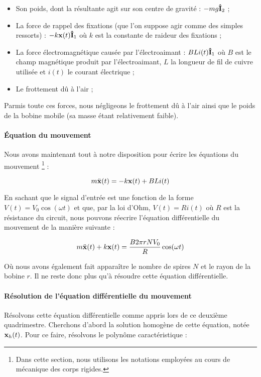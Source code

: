 \begin{itemize}
	\item Son poids, dont la résultante agit sur son centre de gravité : $-mg{\bf\hat{ I}}_2$ ;
	\item La force de rappel des fixations (que l'on suppose agir comme des simples
	ressorts) : $-k {\bf x}(t) {\bf\hat{ I}}_1$ où $k$ est la constante de raideur des fixations ;
	\item La force électromagnétique causée par l'électroaimant : $BLi(t) {\bf\hat{ I}}_1$ où
	$B$ est le champ magnétique produit par l'électroaimant, $L$ la longueur de fil de cuivre
	utilisée et $i(t)$ le courant électrique ;
	\item Le frottement dû à l'air ;
\end{itemize}

Parmis toute ces forces, nous négligeons le frottement dû à l'air ainsi que le poids
de la bobine mobile (sa masse étant relativement faible).

\paragraph{Équation du mouvement}
Nous avons maintenant tout à notre disposition pour écrire les équations du mouvement
\footnote{Dans cette section, nous utilisons les notations employées au cours de
mécanique des corps rigides.} :

$$m\ddot{\bf x}(t) = -k{\bf x}(t) + BLi(t)$$

En sachant que le signal d'entrée est une fonction de la forme $V(t) = V_0 \cos (\omega t)$ et
que, par la loi d'Ohm, $V(t) = Ri(t)$ où $R$ est la résistance du circuit, 
nous pouvons réecrire l'équation différentielle du mouvement de la manière suivante :

$$m\ddot{\bf x}(t) + k{\bf x}(t) = \frac{B2\pi rNV_0}{R}\cos (\omega t)$$

Où nous avons également fait apparaître le nombre de spires $N$ et le rayon de la bobine
$r$. Il ne reste donc plus qu'à résoudre cette équation différentielle.

\paragraph{Résolution de l'équation différentielle du mouvement}
Résolvons cette équation différentielle comme appris lors de ce deuxième
quadrimestre. Cherchons d'abord la solution homogène de cette équation, notée ${\bf x}_h(t)$.
Pour ce faire, résolvons le polynôme caractéristique :

